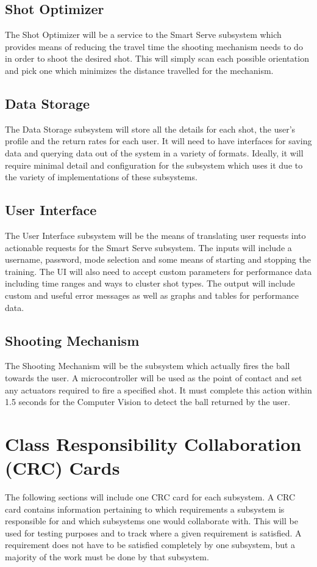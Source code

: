 \documentclass[11pt]{article}
\begin{document}
\subsection{Shot Optimizer}
The Shot Optimizer will be a service to the Smart Serve subsystem which provides means of reducing the travel time the shooting mechanism needs to do in order to shoot the desired shot. This will simply scan each possible orientation and pick one which minimizes the distance travelled for the mechanism.
\subsection{Data Storage}
The Data Storage subsystem will store all the details for each shot, the user's profile and the return rates for each user. It will need to have interfaces for saving data and querying data out of the system in a variety of formats. Ideally, it will require minimal detail and configuration for the subsystem which uses it due to the variety of implementations of these subsystems.
\subsection{User Interface}
The User Interface subsystem will be the means of translating user requests into actionable requests for the Smart Serve subsystem. The inputs will include a username, password, mode selection and some means of starting and stopping the training. The UI will also need to accept custom parameters for performance data including time ranges and ways to cluster shot types. The output will include custom and useful error messages as well as graphs and tables for performance data.
\subsection{Shooting Mechanism}
The Shooting Mechanism will be the subsystem which actually fires the ball towards the user. A microcontroller will be used as the point of contact and set any actuators required to fire a specified shot. It must complete this action within 1.5 seconds for the Computer Vision to detect the ball returned by the user.
\section{Class Responsibility Collaboration (CRC) Cards}
The following sections will include one CRC card for each subsystem. A CRC card contains information pertaining to which requirements a subsystem is responsible for and which subsystems one would collaborate with. This will be used for testing purposes and to track where a given requirement is satisfied. A requirement does not have to be satisfied completely by one subsystem, but a majority of the work must be done by that subsystem.
\end{document}
